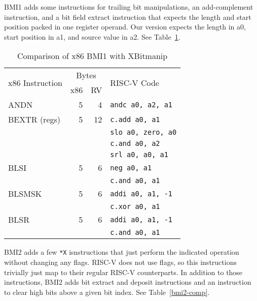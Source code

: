 BMI1 adds some instructions for trailing bit manipulations, an add-complement instruction,
and a bit field extract instruction that expects the length and start position packed in one
register operand. Our version expects the length in a0, start position in a1, and source
value in a2. See Table~\ref{bmi1-comp}.

\begin{table}[h]
\centering
\begin{tabular}{lrrl}
\multirow{2}{*}{x86 Instruction} & \multicolumn{2}{c}{Bytes} & \multirow{2}{*}{RISC-V Code} \\
& x86 & RV & \\
\hline
ANDN    & 5 &  4 & {\tt andc a0, a2, a1} \\
\hline
BEXTR (regs)  & 5 & 12 & {\tt c.add a0, a1} \\
              &   &    & {\tt slo a0, zero, a0} \\
              &   &    & {\tt c.and a0, a2} \\
              &   &    & {\tt srl a0, a0, a1} \\
\hline
BLSI          & 5 &  6 & {\tt neg a0, a1} \\
              &   &    & {\tt c.and a0, a1} \\
\hline
BLSMSK        & 5 &  6 & {\tt addi a0, a1, -1} \\
              &   &    & {\tt c.xor a0, a1} \\
\hline
BLSR          & 5 &  6 & {\tt addi a0, a1, -1} \\
              &   &    & {\tt c.and a0, a1} \\
\end{tabular}
\caption{Comparison of x86 BMI1 with XBitmanip}
\label{bmi1-comp}
\end{table}

BMI2 adds a few \texttt{*X} isnstructions that just perform the indicated
operation without changing any flags. RISC-V does not use flags, so this
instructions trivially just map to their regular RISC-V counterparts. In
addition to those instructions, BMI2 adds bit extract and deposit instructions
and an instruction to clear high bits above a given bit index. See Table~\ref{bmi2-comp}.

